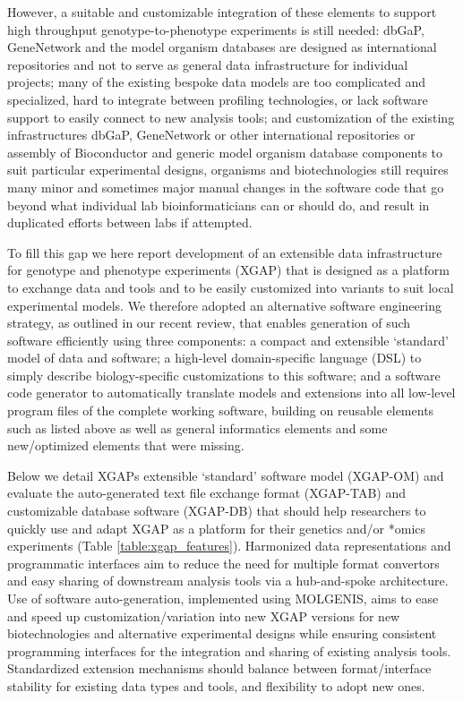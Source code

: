 However, a suitable and customizable integration of these elements to support high throughput genotype-to-phenotype experiments is still needed\cite{Thorisson_2009b}: dbGaP, GeneNetwork and the model organism databases are designed as international repositories and not to serve as general data infrastructure for individual projects; many of the existing bespoke data models are too complicated and specialized, hard to integrate between profiling technologies, or lack software support to easily connect to new analysis tools; and customization of the existing infrastructures dbGaP, GeneNetwork or other international repositories\cite{Zeng_2007, Hu_2007} or assembly of Bioconductor and generic model organism database components to suit particular experimental designs, organisms and biotechnologies still requires many minor and sometimes major manual changes in the software code that go beyond what individual lab bioinformaticians can or should do, and result in duplicated efforts between labs if attempted.

To fill this gap we here report development of an extensible data infrastructure for genotype and phenotype experiments (XGAP) that is designed as a platform to exchange data and tools and to be easily customized into variants to suit local experimental models.
We therefore adopted an alternative software engineering strategy, as outlined in our recent review\cite{Swertz_2007}, that enables generation of such software efficiently using three components: a compact and extensible ‘standard’ model of data and software; a high-level domain-specific language (DSL) to simply describe biology-specific customizations to this software; and a software code generator to automatically translate models and extensions into all low-level program files of the complete working software, building on reusable elements such as listed above as well as general informatics elements and some new/optimized elements that were missing.

Below we detail XGAPs extensible ‘standard’ software model (XGAP-OM) and evaluate the auto-generated text file exchange format (XGAP-TAB) and customizable database software (XGAP-DB) that should help researchers to quickly use and adapt XGAP as a platform for their genetics and/or *omics experiments (Table \ref{table:xgap_features}).
Harmonized data representations and programmatic interfaces aim to reduce the need for multiple format convertors and easy sharing of downstream analysis tools via a hub-and-spoke architecture.
Use of software auto-generation, implemented using MOLGENIS, aims to ease and speed up customization/variation into new XGAP versions for new biotechnologies and alternative experimental designs while ensuring consistent programming interfaces for the integration and sharing of existing analysis tools.
Standardized extension mechanisms should balance between format/interface stability for existing data types and tools, and flexibility to adopt new ones.

